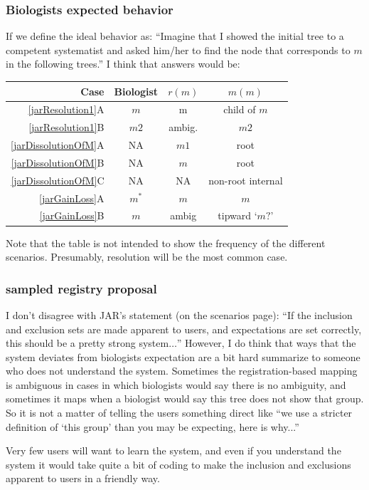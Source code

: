 \documentclass[11pt]{article}
\begin{document}
\subsubsection{Biologists expected behavior}
If we define the ideal behavior as:
  ``Imagine that I showed the initial tree to a competent systematist
  and asked him/her
  to find the node that corresponds to $m$ in the following trees.''
I think that answers would be:\\
\begin{table}[h]
\centering
\begin{tabular}{r|c|c|c}
Case & Biologist & $r(m)$ & $m(m)$ \\
\hline
\ref{jarResolution1}A & $m$ & m & child of $m$ \\
\ref{jarResolution1}B & $m2$ & ambig. & $m2$ \\
\ref{jarDissolutionOfM}A & NA & $m1$ & root \\
\ref{jarDissolutionOfM}B & NA & $m$ & root \\
\ref{jarDissolutionOfM}C & NA & NA & non-root internal \\
\ref{jarGainLoss}A & $m^{\ast}$ & $m$ & $m$ \\
\ref{jarGainLoss}B & $m$ & ambig & tipward `$m?$' \\
\hline
\end{tabular}
\end{table}
Note that the table is not intended to show the frequency of the different scenarios.
Presumably, resolution will be the most common case.

\subsubsection{sampled registry proposal}
I don't disagree with JAR's statement (on the scenarios page): ``If the inclusion and exclusion sets are made apparent to users, and expectations are set correctly, this should be a pretty strong system$\ldots$''
However, I do think that ways that the system deviates from biologists
  expectation are a bit hard summarize to someone who does not understand the system.
Sometimes the registration-based mapping is ambiguous in cases in which biologists
  would say there is no ambiguity, and sometimes it maps when a biologist would say 
  this tree does not show that group.
So it is not a matter of telling the users something direct like
  ``we use a stricter definition of `this group' than you may be expecting, here is why...''

Very few users will want to learn the system, and even if you understand the 
  system it would take quite a bit of coding to make the inclusion and exclusions apparent to users in a friendly way.
\end{document}

